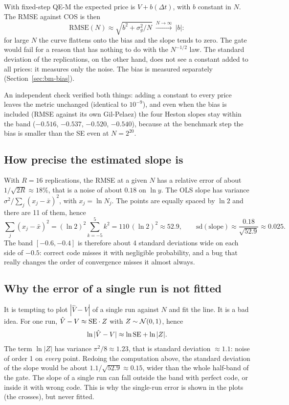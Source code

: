 \begin{perche}[title={Why the bias is removed from the metric for Heston}]
With fixed-step QE-M the expected price is $V+b(\Delta t)$, with $b$ constant in $N$. The RMSE against COS is then
\[
\mathrm{RMSE}(N)\approx\sqrt{b^2+\sigma_g^2/N}\ \xrightarrow{N\to\infty}\ |b| :
\]
for large $N$ the curve flattens onto the bias and the slope tends to zero. The gate would fail for a reason that has
nothing to do with the $N^{-1/2}$ law. The standard deviation of the replications, on the other hand, does not see a
constant added to all prices: it measures only the noise. The bias is measured separately (Section~\ref{sec:bm-bias}).

An independent check verified both things: adding a constant to every price leaves the metric unchanged (identical to
$10^{-9}$), and even when the bias is included (RMSE against its own Gil-Pelaez) the four Heston slopes stay within
the band ($-0.516$, $-0.537$, $-0.520$, $-0.540$), because at the benchmark step the bias is smaller than the SE even
at $N=2^{20}$.
\end{perche}

\subsection{How precise the estimated slope is}
With $R=16$ replications, the RMSE at a given $N$ has a relative error of about $1/\sqrt{2R}\approx18\%$, that is a
noise of about $0.18$ on $\ln y$. The OLS slope has variance $\sigma^2/\sum_j(x_j-\bar x)^2$, with $x_j=\ln N_j$.
The points are equally spaced by $\ln2$ and there are 11 of them, hence
\[
\sum_j(x_j-\bar x)^2=(\ln2)^2\sum_{k=-5}^{5}k^2=110\,(\ln2)^2\approx52.9,
\qquad
\mathrm{sd}(\text{slope})\approx\frac{0.18}{\sqrt{52.9}}\approx0.025 .
\]
The band $[-0.6,-0.4]$ is therefore about 4 standard deviations wide on each side of $-0.5$: correct code misses it
with negligible probability, and a bug that really changes the order of convergence misses it almost always.

\subsection{Why the error of a single run is not fitted}
It is tempting to plot $|\hat V-V|$ of a single run against $N$ and fit the line. It is a bad idea. For one run,
$\hat V-V\approx\mathrm{SE}\cdot Z$ with $Z\sim\mathcal{N}(0,1)$, hence
\[
\ln|\hat V-V|\approx\ln\mathrm{SE}+\ln|Z| .
\]
The term $\ln|Z|$ has variance $\pi^2/8\approx1.23$, that is standard deviation $\approx1.1$: noise of order 1 on
\emph{every} point. Redoing the computation above, the standard deviation of the slope would be about
$1.1/\sqrt{52.9}\approx0.15$, wider than the whole half-band of the gate. The slope of a single run can fall outside
the band with perfect code, or inside it with wrong code. This is why the single-run error is shown in the plots (the
crosses), but never fitted.

